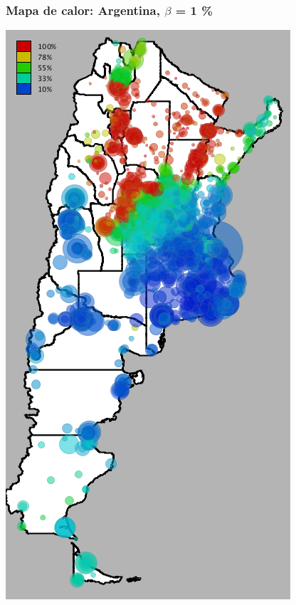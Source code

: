 \documentclass{beamer}
\begin{document}
\begin{frame}
	\frametitle{Mapa de calor: Argentina, $\beta$ = 1 \%}
	\center
	\includegraphics[height=.9\textheight,width = .9\columnwidth, keepaspectratio]
	{slides/201112_hi_res_argentina_usuarios_proporcion_circulos_beta1.png}
\end{frame}
\end{document}
